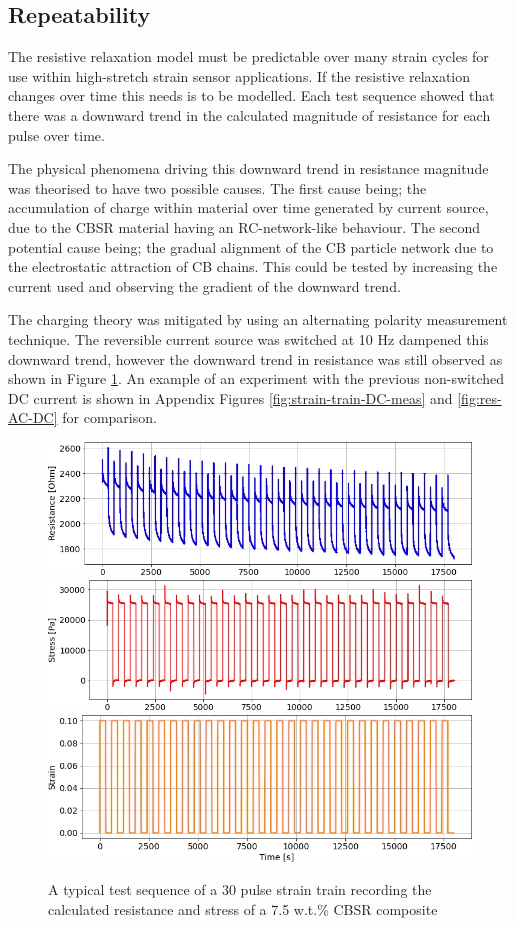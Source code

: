 \subsection{Repeatability}
The resistive relaxation model must be predictable over many strain cycles for use within high-stretch strain sensor applications. If the resistive relaxation changes over time this needs is to be modelled. Each test sequence showed that there was a downward trend in the calculated magnitude of resistance for each pulse over time. 

The physical phenomena driving this downward trend in resistance magnitude was theorised to have two possible causes. The first cause being; the accumulation of charge within material over time generated by current source, due to the CBSR material having an RC-network-like behaviour. The second potential cause being; the gradual alignment of the CB particle network due to the electrostatic attraction of CB chains. This could be tested by increasing the current used and observing the gradient of the downward trend.

The charging theory was mitigated by using an alternating polarity measurement technique. The reversible current source was switched at 10 Hz dampened this downward trend, however the downward trend in resistance was still observed as shown in Figure \ref{fig:repeatability_pulse_trains}. An example of an experiment with the previous non-switched DC current is shown in Appendix Figures \ref{fig:strain-train-DC-meas} and \ref{fig:res-AC-DC} for comparison.
\begin{figure}[H]
	\centering
	\includegraphics[width=0.6\linewidth]{Figures/30_pulse_AC_2-7-5_Epin_20mm_v3_res.jpg}
	\vspace{0.2cm}
	\vfill
	\includegraphics[width=0.6\linewidth]{Figures/30_pulse_AC_2-7-5_Epin_20mm_v3_stress.jpg}
	\vspace{0.2cm}
	\vfill
	\includegraphics[width=0.59\linewidth]{Figures/30_pulse_AC_2-7-5_Epin_20mm_v3_strain.jpg}
	\caption{A typical test sequence of a 30 pulse strain train recording the calculated resistance and stress of a 7.5 w.t.\% CBSR composite}
	\label{fig:repeatability_pulse_trains}
\end{figure}


